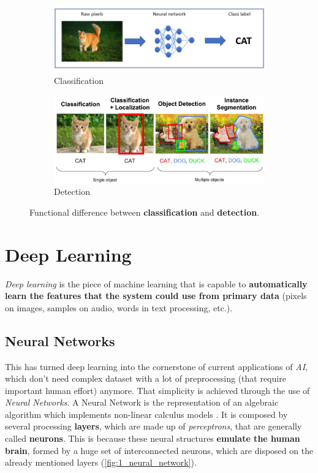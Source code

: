 \begin{figure}[h!]
	\centering
	\begin{subfigure}[h!]{0.6\textwidth}
		\includegraphics[width=\textwidth]{images/classification}
		\caption{Classification}
		\label{fig:1_classification}
	\end{subfigure}
	
	\qquad
	
	\begin{subfigure}[h!]{0.6\textwidth}
		\includegraphics[width=\textwidth]{images/detection}
		\caption{Detection}
		\label{fig:1_detection}			
	\end{subfigure}
	
	\caption{Functional difference between \textbf{classification} and \textbf{detection}.}
	\label{fig:1_class_vs_det}
\end{figure}

\section{Deep Learning}
\emph{Deep learning} is the piece of machine learning that is capable to \textbf{automatically learn the features that the system could use from primary data} (pixels on images, samples on audio, words in text processing, etc.).\\
\subsection{Neural Networks}
This has turned deep learning into the cornerstone of current applications of \emph{AI}, which don't need complex dataset with a lot of preprocessing (that require important human effort) anymore. That simplicity is achieved through the use of \emph{Neural Networks}. A Neural Network is the representation of an algebraic algorithm which implements non-linear calculus models \cite{dl-nature}. It is composed by several processing \textbf{layers}, which are made up of \emph{perceptrons}, that are generally called \textbf{neurons}. This is because these neural structures \textbf{emulate the human brain}, formed by a huge set of interconnected neurons, which are disposed on the already mentioned layers (\autoref{fig:1_neural_network}).\\

